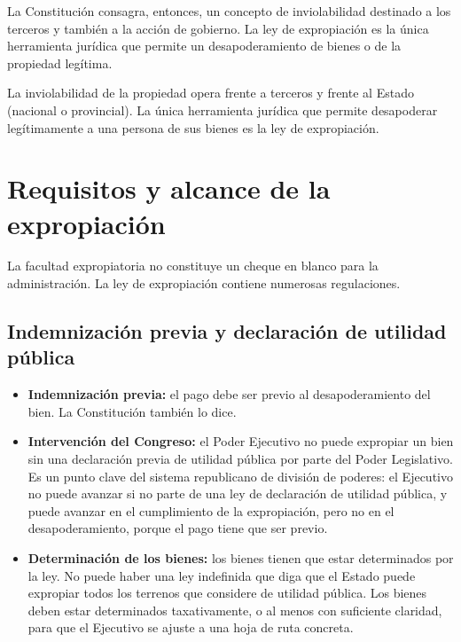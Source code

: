 \documentclass[12pt,oneside]{book}
\begin{document}
La Constitución consagra, entonces, un concepto de inviolabilidad destinado a los terceros y también a la acción de gobierno. La ley de expropiación es la única herramienta jurídica que permite un desapoderamiento de bienes o de la propiedad legítima.

\begin{important}
La inviolabilidad de la propiedad opera frente a terceros y frente al Estado (nacional o provincial). La única herramienta jurídica que permite desapoderar legítimamente a una persona de sus bienes es la ley de expropiación.
\end{important}

\section{Requisitos y alcance de la expropiación}

La facultad expropiatoria no constituye un cheque en blanco para la administración. La ley de expropiación contiene numerosas regulaciones.

\subsection{Indemnización previa y declaración de utilidad pública}

\begin{itemize}
    \item \textbf{Indemnización previa:} el pago debe ser previo al desapoderamiento del bien. La Constitución también lo dice.
    \item \textbf{Intervención del Congreso:} el Poder Ejecutivo no puede expropiar un bien sin una declaración previa de utilidad pública por parte del Poder Legislativo. Es un punto clave del sistema republicano de división de poderes: el Ejecutivo no puede avanzar si no parte de una ley de declaración de utilidad pública, y puede avanzar en el cumplimiento de la expropiación, pero no en el desapoderamiento, porque el pago tiene que ser previo.
    \item \textbf{Determinación de los bienes:} los bienes tienen que estar determinados por la ley. No puede haber una ley indefinida que diga que el Estado puede expropiar todos los terrenos que considere de utilidad pública. Los bienes deben estar determinados taxativamente, o al menos con suficiente claridad, para que el Ejecutivo se ajuste a una hoja de ruta concreta.
\end{itemize}
\end{document}
